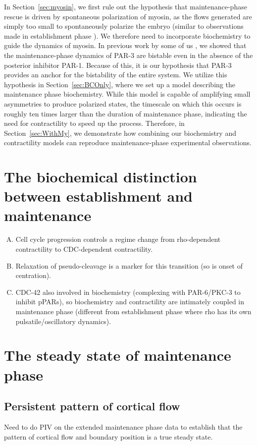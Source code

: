 \documentclass[11pt]{article}
\newcommand{\red}[1]{\color{red}#1\normalcolor}
\newcommand{\6}[1]{#1_{\text{6}}}
\newcommand{\3}[1]{#1_{\text{3}}}
\begin{document}
In Section\ \ref{sec:myosin}, we first rule out the hypothesis that maintenance-phase rescue is driven by spontaneous polarization of myosin, as the flows generated are simply too small to spontaneously polarize the embryo (similar to observations made in establishment phase \cite{nishikawa2017controlling}). We therefore need to incorporate biochemistry to guide the dynamics of myosin. In previous work by some of us \cite{lang2023oligomerization}, we showed that the maintenance-phase dynamics of PAR-3 are bistable even in the absence of the posterior inhibitor PAR-1. Because of this, it is our hypothesis that PAR-3 provides an anchor for the bistability of the entire system. We utilize this hypothesis in Section\ \ref{sec:BCOnly}, where we set up a model describing the maintenance phase biochemistry. While this model is capable of amplifying small asymmetries to produce polarized states, the timescale on which this occurs is roughly ten times larger than the duration of maintenance phase, indicating the need for contractility to speed up the process. Therefore, in Section\ \ref{sec:WithMy}, we demonstrate how combining our biochemistry and contractility models can reproduce maintenance-phase experimental observations.

\section{The biochemical distinction between establishment and maintenance}
\begin{enumerate}[(A)]
 \item Cell cycle progression controls a regime change from rho-dependent contractility to CDC-dependent contractility.
\item Relaxation of pseudo-cleavage is a marker for this transition (so is onset of centration).
\item CDC-42 also involved in biochemistry (complexing with PAR-6/PKC-3 to inhibit pPARs), so biochemistry and contractility are intimately coupled in maintenance phase (different from establishment phase where rho has its own pulsatile/oscillatory dynamics). 
\end{enumerate}

\section{The steady state of maintenance phase }

\subsection{Persistent pattern of cortical flow}
\red{Need to do PIV on the extended maintenance phase data to establish that the pattern of cortical flow and boundary position is a true steady state.}
\end{document}
